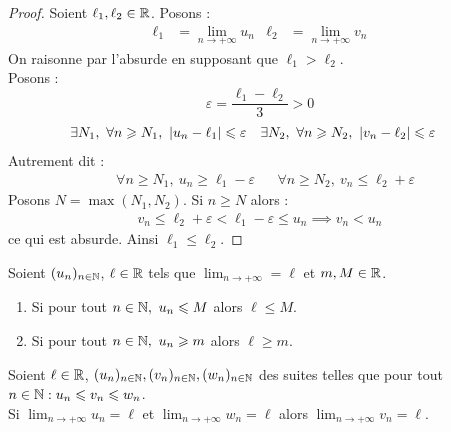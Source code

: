 \begin{proof}
    Soient $\ell_1, \ell_2 \in \mathbb{R}$.
    Posons :
    \begin{align*}
        \ell_1 &= \lim_{n \to +\infty} u_n & \ell_2 &= \lim_{n \to +\infty} v_n
    \end{align*}
    On raisonne par l'absurde en supposant que $\ell_1 > \ell_2$.
    \\
    Posons : 
    \[ \varepsilon = \frac{\ell_1 - \ell_2}{3} > 0 \]
    \begin{align*}
        &\exists N_1,\ \forall n \geqslant N_1,\ \abs{u_n - \ell_1} \leqslant \varepsilon & 
        &\exists N_2,\ \forall n \geqslant N_2,\ \abs{v_n - \ell_2} \leqslant \varepsilon
    \end{align*}
    Autrement dit :
    \begin{align*}
        &\forall n \geq N_1,\ u_n \geq \ell_1 - \varepsilon &
        &\forall n \geq N_2,\ v_n \leq \ell_2 + \varepsilon
    \end{align*}
    Posons $N = \max(N_1, N_2)$. Si $n \geq N$ alors :
    \begin{align*}
        v_n \leq \ell_2 + \varepsilon < \ell_1 - \varepsilon \leq u_n \implies v_n < u_n
    \end{align*}
    ce qui est absurde. Ainsi $\ell_1 \leq \ell_2$.
\end{proof}

\begin{corollary}
    Soient $(u_n)_{n \in \mathbb{N}}$, $\ell \in \mathbb{R}$ tels que $\lim_{n \to +\infty} = \ell$ et $m, M \in \mathbb{R}$.
    \begin{enumerate}
            \item Si pour tout $n \in \mathbb{N},\ u_n \leqslant M$ alors $\ell \leq M$.
            \item Si pour tout $n \in \mathbb{N},\ u_n \geqslant m$ alors $\ell \geq m$.
    \end{enumerate}
\end{corollary}

\begin{theorem}
    Soient $\ell \in \mathbb{R}$, $(u_n)_{n \in \mathbb{N}}, (v_n)_{n \in \mathbb{N}}, (w_n)_{n \in \mathbb{N}}$ des suites telles que pour tout $n \in \mathbb{N} : u_n \leqslant v_n \leqslant w_n $.
    \\
    Si $\lim_{n \to +\infty} u_n = \ell$ et $\lim_{n \to +\infty} w_n = \ell$ alors $\lim_{n \to + \infty} v_n = \ell$.
\end{theorem}

